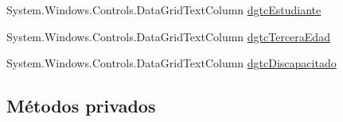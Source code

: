 \begin{DoxyCompactItemize}
\item 
System.\-Windows.\-Controls.\-Data\-Grid\-Text\-Column \hyperlink{class_proyecto___integrador__3_1_1_reportes_1_1_reporte_por_unidad_a544a15cf1c63259da29da75d20618a1d}{dgtc\-Estudiante}
\item 
System.\-Windows.\-Controls.\-Data\-Grid\-Text\-Column \hyperlink{class_proyecto___integrador__3_1_1_reportes_1_1_reporte_por_unidad_a717db9d78e9f0644d009266a9b3bb345}{dgtc\-Tercera\-Edad}
\item 
System.\-Windows.\-Controls.\-Data\-Grid\-Text\-Column \hyperlink{class_proyecto___integrador__3_1_1_reportes_1_1_reporte_por_unidad_a3ed4719c9c58f9d5ad88eb0d5c700898}{dgtc\-Discapacitado}
\end{DoxyCompactItemize}
\subsection*{Métodos privados}
